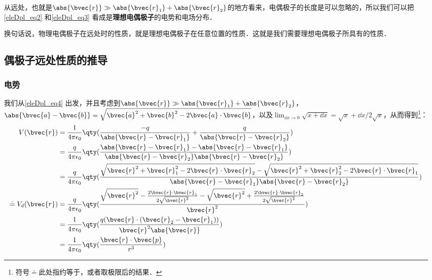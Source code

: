 从远处，也就是$\abs{\bvec{r}}\gg\\\abs{\bvec{r}_1}+\abs{\bvec{r}_2}$的地方看来，电偶极子的长度是可以忽略的，所以我们可以把\autoref{eleDpl_eq2} 和\autoref{eleDpl_eq3} 看成是\textbf{理想电偶极子}的电势和电场分布．

换句话说，物理电偶极子在远处时的性质，就是理想电偶极子在任意位置的性质．这就是我们需要理想电偶极子所具有的性质．



\subsection{偶极子远处性质的推导}

\subsubsection{电势}

我们从\autoref{eleDpl_eq4} 出发，并且考虑到$\abs{\bvec{r}}\gg\\\abs{\bvec{r}_1}+\abs{\bvec{r}_2}$，$\abs{\bvec{a}-\bvec{b}}=\sqrt{\bvec{a}^2+\bvec{b}^2-2\bvec{a}\cdot\bvec{b}}$，以及$\lim_{\dd x\rightarrow 0}\sqrt{x+\dd x}=\sqrt{x}+\dd x/2\sqrt{x}$，从而得到\footnote{符号$\doteq$此处指约等于，或者取极限后的结果．}：
\begin{equation}
\begin{aligned}
V(\bvec{r})&=\frac{1}{4\pi\epsilon_0}\qty(\frac{-q}{\abs{\bvec{r}-\bvec{r}_1}}+\frac{q}{\abs{\bvec{r}-\bvec{r}_2}})\\
&=\frac{q}{4\pi\epsilon_0}\qty(\frac{\abs{\bvec{r}-\bvec{r}_1}-\abs{\bvec{r}-\bvec{r}_1}}{\abs{\bvec{r}-\bvec{r}_2}\abs{\bvec{r}-\bvec{r}_2}})\\
&=\frac{q}{4\pi\epsilon_0}\qty(\frac{\sqrt{\bvec{r}^2+\bvec{r}_1^2-2\bvec{r}\cdot\bvec{r}_2}-\sqrt{\bvec{r}^2+\bvec{r}_2^2-2\bvec{r}\cdot\bvec{r}_1}}{\abs{\bvec{r}-\bvec{r}_1}\abs{\bvec{r}-\bvec{r}_2}})\\
\doteq V_d(\bvec{r})&=\frac{q}{4\pi\epsilon_0}\qty(\frac{\sqrt{\bvec{r}^2}-\frac{2\bvec{r}\cdot\bvec{r}_1}{2\sqrt{\bvec{r}^2}}-\sqrt{\bvec{r}^2}+\frac{2\bvec{r}\cdot\bvec{r}_2}{2\sqrt{\bvec{r}^2}}}{\bvec{r}^2})\\
&=\frac{1}{4\pi\epsilon_0}\qty(\frac{q(\bvec{r}\cdot(\bvec{r}_2-\bvec{r}_1))}{\bvec{r}^2\abs{\bvec{r}}})\\
&=\frac{1}{4\pi\epsilon_0}\qty(\frac{\bvec{r}\cdot\bvec{p}}{r^3})
\end{aligned}
\end{equation}



